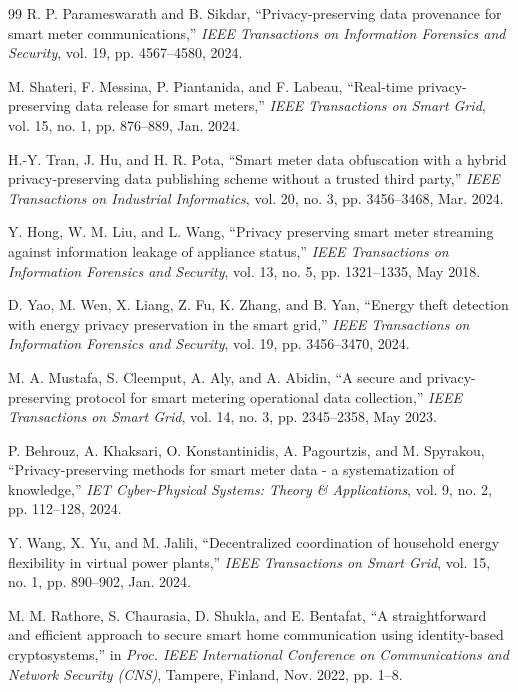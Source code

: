 \documentclass[conference]{IEEEtran}
\begin{document}
\begin{thebibliography}{99}
R. P. Parameswarath and B. Sikdar, ``Privacy-preserving data provenance for smart meter communications,'' \textit{IEEE Transactions on Information Forensics and Security}, vol. 19, pp. 4567--4580, 2024.

M. Shateri, F. Messina, P. Piantanida, and F. Labeau, ``Real-time privacy-preserving data release for smart meters,'' \textit{IEEE Transactions on Smart Grid}, vol. 15, no. 1, pp. 876--889, Jan. 2024.

H.-Y. Tran, J. Hu, and H. R. Pota, ``Smart meter data obfuscation with a hybrid privacy-preserving data publishing scheme without a trusted third party,'' \textit{IEEE Transactions on Industrial Informatics}, vol. 20, no. 3, pp. 3456--3468, Mar. 2024.

Y. Hong, W. M. Liu, and L. Wang, ``Privacy preserving smart meter streaming against information leakage of appliance status,'' \textit{IEEE Transactions on Information Forensics and Security}, vol. 13, no. 5, pp. 1321--1335, May 2018.

D. Yao, M. Wen, X. Liang, Z. Fu, K. Zhang, and B. Yan, ``Energy theft detection with energy privacy preservation in the smart grid,'' \textit{IEEE Transactions on Information Forensics and Security}, vol. 19, pp. 3456--3470, 2024.

M. A. Mustafa, S. Cleemput, A. Aly, and A. Abidin, ``A secure and privacy-preserving protocol for smart metering operational data collection,'' \textit{IEEE Transactions on Smart Grid}, vol. 14, no. 3, pp. 2345--2358, May 2023.

P. Behrouz, A. Khaksari, O. Konstantinidis, A. Pagourtzis, and M. Spyrakou, ``Privacy-preserving methods for smart meter data - a systematization of knowledge,'' \textit{IET Cyber-Physical Systems: Theory \& Applications}, vol. 9, no. 2, pp. 112--128, 2024.

Y. Wang, X. Yu, and M. Jalili, ``Decentralized coordination of household energy flexibility in virtual power plants,'' \textit{IEEE Transactions on Smart Grid}, vol. 15, no. 1, pp. 890--902, Jan. 2024.

M. M. Rathore, S. Chaurasia, D. Shukla, and E. Bentafat, ``A straightforward and efficient approach to secure smart home communication using identity-based cryptosystems,'' in \textit{Proc. IEEE International Conference on Communications and Network Security (CNS)}, Tampere, Finland, Nov. 2022, pp. 1--8.


\end{thebibliography}
\end{document}
